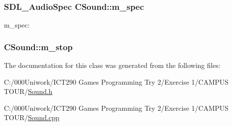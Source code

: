 \subsubsection[{\texorpdfstring{m\+\_\+spec}{m_spec}}]{\setlength{\rightskip}{0pt plus 5cm}S\+D\+L\+\_\+\+Audio\+Spec C\+Sound\+::m\+\_\+spec}\hypertarget{class_c_sound_ac41facd6fbd54c78f6b2d19608aa3217}{}\label{class_c_sound_ac41facd6fbd54c78f6b2d19608aa3217}
m\+\_\+spec\+: 
\subsubsection[{\texorpdfstring{m\+\_\+stop}{m_stop}}]{ C\+Sound\+::m\+\_\+stop}\hypertarget{class_c_sound_a26b1e9f2a8e7b3a8b2ba313ff56fa199}{}\label{class_c_sound_a26b1e9f2a8e7b3a8b2ba313ff56fa199}


The documentation for this class was generated from the following files\+:\begin{DoxyCompactItemize}
\item 
C\+:/000\+Uniwork/\+I\+C\+T290 Games Programming Try 2/\+Exercise 1/\+C\+A\+M\+P\+U\+S T\+O\+U\+R/\hyperlink{_sound_8h}{Sound.\+h}\item 
C\+:/000\+Uniwork/\+I\+C\+T290 Games Programming Try 2/\+Exercise 1/\+C\+A\+M\+P\+U\+S T\+O\+U\+R/\hyperlink{_sound_8cpp}{Sound.\+cpp}\end{DoxyCompactItemize}
